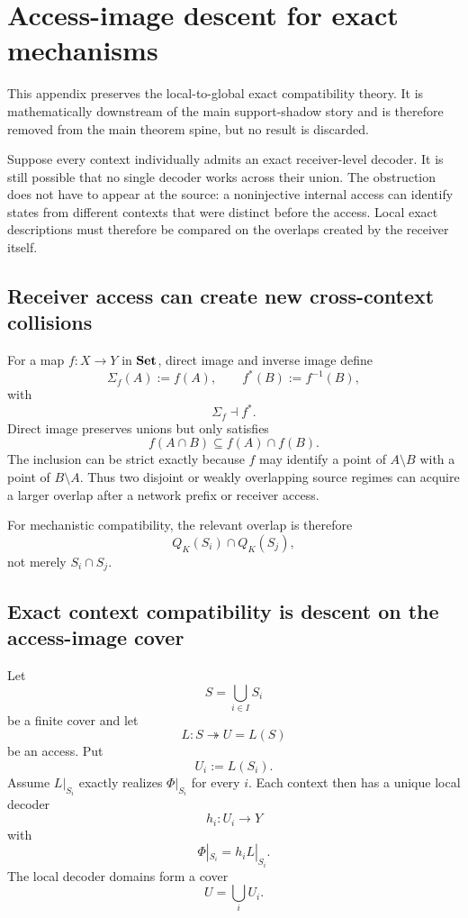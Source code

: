 \section{Access-image descent for exact mechanisms}
\label{app:access-image-descent}

This appendix preserves the local-to-global exact compatibility theory. It is mathematically downstream of the main support-shadow story and is therefore removed from the main theorem spine, but no result is discarded.

Suppose every context individually admits an exact receiver-level decoder. It is still possible that no single decoder works across their union. The obstruction does not have to appear at the source: a noninjective internal access can identify states from different contexts that were distinct before the access. Local exact descriptions must therefore be compared on the overlaps created by the receiver itself.

\subsection{Receiver access can create new cross-context collisions}

For a map $f:X\to Y$ in $\mathbf{Set}$, direct image and inverse image define
\[
\Sigma_f(A):=f(A),
\qquad
f^*(B):=f^{-1}(B),
\]
with
\begin{equation}
\Sigma_f\dashv f^*.
\label{eq:app-direct-inverse-adjunction}
\end{equation}
Direct image preserves unions but only satisfies
\begin{equation}
f(A\cap B)
\subseteq
f(A)\cap f(B).
\label{eq:app-direct-image-created-overlap}
\end{equation}
The inclusion can be strict exactly because $f$ may identify a point of $A\setminus B$ with a point of $B\setminus A$. Thus two disjoint or weakly overlapping source regimes can acquire a larger overlap after a network prefix or receiver access.

For mechanistic compatibility, the relevant overlap is therefore
\[
Q_K(S_i)\cap Q_K(S_j),
\]
not merely $S_i\cap S_j$.

\subsection{Exact context compatibility is descent on the access-image cover}

Let
\[
S=\bigcup_{i\in I}S_i
\]
be a finite cover and let
\[
L:S\twoheadrightarrow U=L(S)
\]
be an access. Put
\[
U_i:=L(S_i).
\]
Assume $L|_{S_i}$ exactly realizes $\Phi|_{S_i}$ for every $i$. Each context then has a unique local decoder
\[
h_i:U_i\to Y
\]
with
\[
\Phi|_{S_i}=h_iL|_{S_i}.
\]
The local decoder domains form a cover
\[
U=\bigcup_iU_i.
\]

